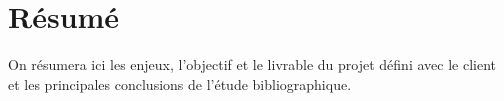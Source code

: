 \section{Résumé}

On résumera ici les enjeux, l'objectif et le livrable du projet défini avec le client
et les principales conclusions de l'étude bibliographique.